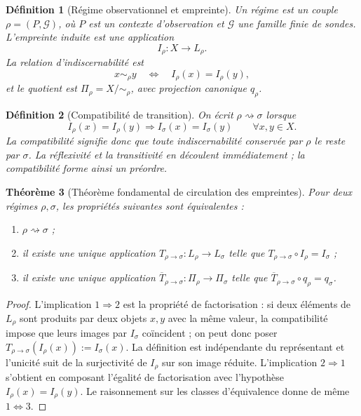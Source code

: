 \documentclass[11pt,a4paper,openany]{book}
\newtheorem{definition}{Définition}[chapter]
\newtheorem{theorem}[definition]{Théorème}
\begin{document}
\begin{definition}[Régime observationnel et empreinte]
Un régime est un couple \(\rho=(P,\mathcal G)\), où \(P\) est un contexte d'observation et \(\mathcal G\) une famille finie de sondes. L'empreinte induite est une application
\[
I_\rho:X\longrightarrow L_\rho.
\]
La relation d'indiscernabilité est
\[
x\sim_\rho y\quad\Longleftrightarrow\quad I_\rho(x)=I_\rho(y),
\]
et le quotient est \(\Pi_\rho=X/{\sim_\rho}\), avec projection canonique \(q_\rho\).
\end{definition}

\begin{definition}[Compatibilité de transition]
On écrit \(\rho\rightsquigarrow\sigma\) lorsque
\[
I_\rho(x)=I_\rho(y)\Longrightarrow I_\sigma(x)=I_\sigma(y)
\qquad\forall x,y\in X.
\]
La compatibilité signifie donc que toute indiscernabilité conservée par \(\rho\) le reste par \(\sigma\). La réflexivité et la transitivité en découlent immédiatement ; la compatibilité forme ainsi un préordre.
\end{definition}

\begin{theorem}[Théorème fondamental de circulation des empreintes]
Pour deux régimes \(\rho,\sigma\), les propriétés suivantes sont équivalentes :
\begin{enumerate}
\item \(\rho\rightsquigarrow\sigma\) ;
\item il existe une unique application \(T_{\rho\to\sigma}:L_\rho\to L_\sigma\) telle que \(T_{\rho\to\sigma}\circ I_\rho=I_\sigma\) ;
\item il existe une unique application \(\overline T_{\rho\to\sigma}:\Pi_\rho\to\Pi_\sigma\) telle que \(\overline T_{\rho\to\sigma}\circ q_\rho=q_\sigma\).
\end{enumerate}
\end{theorem}

\begin{proof}
L'implication \(1\Rightarrow2\) est la propriété de factorisation : si deux éléments de \(L_\rho\) sont produits par deux objets \(x,y\) avec la même valeur, la compatibilité impose que leurs images par \(I_\sigma\) coïncident ; on peut donc poser \(T_{\rho\to\sigma}(I_\rho(x)):=I_\sigma(x)\). La définition est indépendante du représentant et l'unicité suit de la surjectivité de \(I_\rho\) sur son image réduite. L'implication \(2\Rightarrow1\) s'obtient en composant l'égalité de factorisation avec l'hypothèse \(I_\rho(x)=I_\rho(y)\). Le raisonnement sur les classes d'équivalence donne de même \(1\Leftrightarrow3\).
\end{proof}
\end{document}
